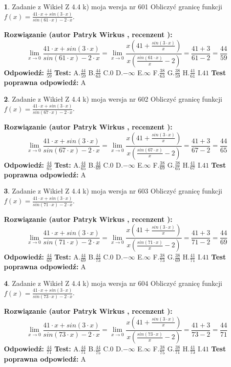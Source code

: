 \documentclass[12pt, a4paper]{article}
\theoremstyle{definition} %
\newtheorem{zad}{}
\newcommand{\zadStart}[1]{\begin{zad}#1\newline}
\newcommand{\zadStop}{\end{zad}}
\newcommand{\rozwStart}[2]{\noindent \textbf{Rozwiązanie (autor #1 , recenzent #2): }\newline}
\newcommand{\rozwStop}{\newline}
\newcommand{\odpStart}{\noindent \textbf{Odpowiedź:}\newline}
\newcommand{\odpStop}{\newline}
\newcommand{\testStart}{\noindent \textbf{Test:}\newline}
\newcommand{\testStop}{\newline}
\newcommand{\kluczStart}{\noindent \textbf{Test poprawna odpowiedź:}\newline}
\newcommand{\kluczStop}{\newline}
\begin{document}
\zadStart{Zadanie z Wikieł Z 4.4 k) moja wersja nr 601}
Obliczyć granicę funkcji $f(x)=\frac{41\cdot x +sin(3\cdot x)}{sin(61\cdot x) -2\cdot x}$.
\zadStop
\rozwStart{Patryk Wirkus}{}
$$\lim\limits_{x\to 0}\frac{41\cdot x +sin(3\cdot x)}{sin(61\cdot x) -2\cdot x}
=\lim\limits_{x\to 0}\frac{x(41+\frac{sin(3\cdot x)}{x})}{x(\frac{sin(61\cdot x)}{x}-2)}
=\frac{41+3}{61-2} = \frac{44}{59}$$
\rozwStop
\odpStart
$\frac{44}{59}$
\odpStop
\testStart
A.$\frac{44}{59}$
B.$\frac{44}{63}$
C.$0$
D.$-\infty$
E.$\infty$
F.$\frac{38}{63}$
G.$\frac{38}{59}$
H.$\frac{41}{61}$
I.$41$
\testStop
\kluczStart
A
\kluczStop



\zadStart{Zadanie z Wikieł Z 4.4 k) moja wersja nr 602}
Obliczyć granicę funkcji $f(x)=\frac{41\cdot x +sin(3\cdot x)}{sin(67\cdot x) -2\cdot x}$.
\zadStop
\rozwStart{Patryk Wirkus}{}
$$\lim\limits_{x\to 0}\frac{41\cdot x +sin(3\cdot x)}{sin(67\cdot x) -2\cdot x}
=\lim\limits_{x\to 0}\frac{x(41+\frac{sin(3\cdot x)}{x})}{x(\frac{sin(67\cdot x)}{x}-2)}
=\frac{41+3}{67-2} = \frac{44}{65}$$
\rozwStop
\odpStart
$\frac{44}{65}$
\odpStop
\testStart
A.$\frac{44}{65}$
B.$\frac{44}{69}$
C.$0$
D.$-\infty$
E.$\infty$
F.$\frac{38}{69}$
G.$\frac{38}{65}$
H.$\frac{41}{67}$
I.$41$
\testStop
\kluczStart
A
\kluczStop



\zadStart{Zadanie z Wikieł Z 4.4 k) moja wersja nr 603}
Obliczyć granicę funkcji $f(x)=\frac{41\cdot x +sin(3\cdot x)}{sin(71\cdot x) -2\cdot x}$.
\zadStop
\rozwStart{Patryk Wirkus}{}
$$\lim\limits_{x\to 0}\frac{41\cdot x +sin(3\cdot x)}{sin(71\cdot x) -2\cdot x}
=\lim\limits_{x\to 0}\frac{x(41+\frac{sin(3\cdot x)}{x})}{x(\frac{sin(71\cdot x)}{x}-2)}
=\frac{41+3}{71-2} = \frac{44}{69}$$
\rozwStop
\odpStart
$\frac{44}{69}$
\odpStop
\testStart
A.$\frac{44}{69}$
B.$\frac{44}{73}$
C.$0$
D.$-\infty$
E.$\infty$
F.$\frac{38}{73}$
G.$\frac{38}{69}$
H.$\frac{41}{71}$
I.$41$
\testStop
\kluczStart
A
\kluczStop



\zadStart{Zadanie z Wikieł Z 4.4 k) moja wersja nr 604}
Obliczyć granicę funkcji $f(x)=\frac{41\cdot x +sin(3\cdot x)}{sin(73\cdot x) -2\cdot x}$.
\zadStop
\rozwStart{Patryk Wirkus}{}
$$\lim\limits_{x\to 0}\frac{41\cdot x +sin(3\cdot x)}{sin(73\cdot x) -2\cdot x}
=\lim\limits_{x\to 0}\frac{x(41+\frac{sin(3\cdot x)}{x})}{x(\frac{sin(73\cdot x)}{x}-2)}
=\frac{41+3}{73-2} = \frac{44}{71}$$
\rozwStop
\odpStart
$\frac{44}{71}$
\odpStop
\testStart
A.$\frac{44}{71}$
B.$\frac{44}{75}$
C.$0$
D.$-\infty$
E.$\infty$
F.$\frac{38}{75}$
G.$\frac{38}{71}$
H.$\frac{41}{73}$
I.$41$
\testStop
\kluczStart
A
\kluczStop
\end{document}
